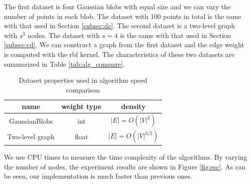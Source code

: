 The first dataset is four Gaussian blobs with equal size and we can vary the number of points in each blob. The dataset with 100 points in total is the same with that used in 
Section \ref{subsec:dc}. The second dataset is a two-level graph with $s^3$ nodes. The dataset with $s=4$ is the same with that used in Section \ref{subsec:cd}.
We can construct a graph from the first dataset and the edge weight is computed with the rbf kernel. The characteristics of these two datasets are summarized in
Table \ref{tab:alg_compare}.
\begin{table}[!ht]
\centering
\begin{tabular}{ccc}
\hline
name & weight type & density \\
\hline
GaussianBlobs & int & $|E|=O(|V|^2)$\\
Two-level graph & float & $|E|=O(|V|^{3/2})$\\
\hline
\end{tabular}
\caption{Dataset properties used in algorithm speed comparison}
\end{table}
We use CPU times to measure the time complexity of the algorithms. By varying the number of nodes, the experiment results are shown in Figure \ref{fig:esc}.
As can be seen, our implementation is much faster than previous ones.

